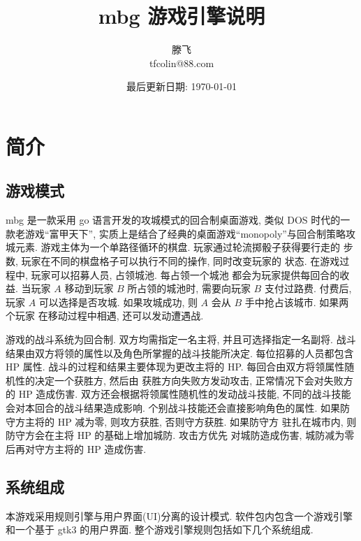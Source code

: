 \documentclass[UTF8, zihao=-4]{ctexart} %
\title{mbg 游戏引擎说明}
\date{最后更新日期: \today}
\author{滕飞 \\ tfcolin@88.com}
\begin{document}
\maketitle

\section{简介}
\subsection{游戏模式}
mbg 是一款采用 go 语言开发的攻城模式的回合制桌面游戏, 类似 DOS 时代的一款老游戏``富甲天下'', 
实质上是结合了经典的桌面游戏``monopoly''与回合制策略攻城元素. 
游戏主体为一个单路径循环的棋盘. 玩家通过轮流掷骰子获得要行走的
步数, 玩家在不同的棋盘格子可以执行不同的操作, 同时改变玩家的
状态. 在游戏过程中, 玩家可以招募人员, 占领城池. 每占领一个城池
都会为玩家提供每回合的收益. 当玩家 $A$ 移动到玩家 $B$ 所占领的城池时, 
需要向玩家 $B$ 支付过路费. 付费后, 玩家 $A$ 可以选择是否攻城. 
如果攻城成功, 则 $A$ 会从 $B$ 手中抢占该城市. 如果两个玩家
在移动过程中相遇, 还可以发动遭遇战.

游戏的战斗系统为回合制. 双方均需指定一名主将, 并且可选择指定一名副将.
战斗结果由双方将领的属性以及角色所掌握的战斗技能所决定.
每位招募的人员都包含 HP 属性. 
战斗的过程和结果主要体现为更改主将的 HP. 
每回合由双方将领属性随机性的决定一个获胜方, 然后由
获胜方向失败方发动攻击, 正常情况下会对失败方的 HP 造成伤害.
双方还会根据将领属性随机性的发动战斗技能, 不同的战斗技能
会对本回合的战斗结果造成影响. 个别战斗技能还会直接影响角色的属性.
如果防守方主将的 HP 减为零, 则攻方获胜, 否则守方获胜. 如果防守方
驻扎在城市内, 则防守方会在主将 HP 的基础上增加城防. 攻击方优先
对城防造成伤害, 城防减为零后再对守方主将的 HP 造成伤害.

\subsection{系统组成}
本游戏采用规则引擎与用户界面(UI)分离的设计模式. 软件包内包含一个游戏引擎和一个基于 gtk3 的用户界面. 
整个游戏引擎规则包括如下几个系统组成.
\end{document}

